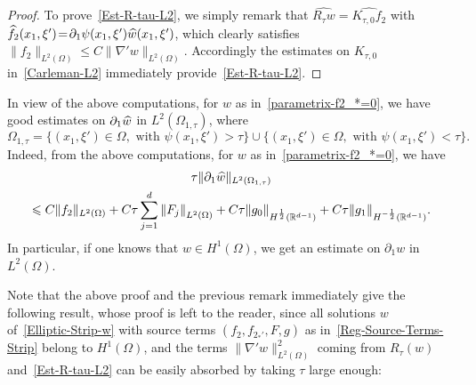 \documentclass[AHL,Unicode,longabstracts]{cedram}
\newcommand*\R{\mathbb{R}}
\renewcommand{\leq}{\leqslant}
\renewcommand{\hat}{\widehat}
\let\oldhat\hat
\renewcommand*{\hat}[1]{\mathchoice{\widehat{#1}}{\widehat{#1}}{\oldhat{#1}}{\oldhat{#1}}}
\begin{document}
\begin{proof}
To prove~\eqref{Est-R-tau-L2}, we simply remark that $\widehat {R_\tau w}\! = \!\widehat {K_{\tau,0} f_2}$ with $\widehat f_2 (x_1, \xi')\! =\! \partial_1 \psi(x_1, \xi')\linebreak \widehat w(x_1, \xi')$, which clearly satisfies $\| f_2 \|_{L^2(\Omega)} \leq C \| \nabla' w\|_{L^2(\Omega)}$. Accordingly the estimates on $K_{\tau,0}$ in~\eqref{Carleman-L2} immediately provide~\eqref{Est-R-tau-L2}.
\end{proof}

In view of the above computations, for $w$ as in~\eqref{parametrix-f2_*=0}, we have good estimates on $\partial_1 \hat w$ in $L^2(\Omega_{1, \tau})$, where
\begin{equation}\label{Def-Omega-1-tau}
\Omega_{1,\tau} = \{ (x_1, \xi') \in \Omega,\text{ with } \psi(x_1, \xi') > \tau \}
\cup \{ (x_1, \xi') \in \Omega,\text{ with } \psi(x_1, \xi') < \tau \}.
\end{equation}
Indeed, from the above computations, for $w$ as in~\eqref{parametrix-f2_*=0}, we have
\begin{multline}\label{Est-d1-Hilbertian-Est}
\tau \| \partial_1 \hat w \|_{L^2(\Omega_{1, \tau})}\\
\leq C \| f_2 \|_{L^2(\Omega)}
+ C \tau \sum_{j = 1}^d \left\| F_j\right\|_{L^2(\Omega)}
+ C \tau \| g_0 \|_{H^{\frac{1}{2}}\left(\R^{d-1}\right)} + C\tau \| g_1\|_{H^{-\frac{1}{2}}\left(\R^{d-1}\right)}.
\end{multline}
In particular, if one knows that $w \in H^1(\Omega)$, we get an estimate on $\partial_1 w$ in $L^2(\Omega)$.

Note that the above proof and the previous remark immediately give the following result, whose proof is left to the reader, since all solutions $w$ of~\eqref{Elliptic-Strip-w} with source terms $(f_2, f_{2_*'},F,g)$ as in~\eqref{Reg-Source-Terms-Strip} belong to $H^1(\Omega)$, and the terms $\| \nabla' w\|_{L^2(\Omega)}^2$ coming from $R_\tau(w)$ and~\eqref{Est-R-tau-L2} can be easily absorbed by taking $\tau$ large enough:
\end{document}
